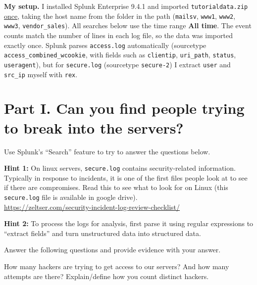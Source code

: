 \documentclass[a4paper, 10pt]{article}
\begin{document}
\myspace

\noindent\textbf{My setup.} I installed Splunk Enterprise 9.4.1 and imported \texttt{tutorialdata.zip} \underline{once},
taking the host name from the folder in the path (\texttt{mailsv}, \texttt{www1}, \texttt{www2}, \texttt{www3}, \texttt{vendor\_sales}).
All searches below use the time range \textbf{All time}.
The event counts match the number of lines in each log file, so the data was imported exactly once.
Splunk parses \texttt{access.log} automatically (sourcetype \texttt{access\_combined\_wcookie}, with fields such as
\texttt{clientip}, \texttt{uri\_path}, \texttt{status}, \texttt{useragent}),
but for \texttt{secure.log} (sourcetype \texttt{secure-2}) I extract \texttt{user} and \texttt{src\_ip} myself with \texttt{rex}.

\section*{\textbf{Part I.} Can you find people trying to break into the servers?}

Use Splunk's ``Search'' feature to try to answer the questions below.

\noindent \textbf{Hint 1:} On linux servers, \texttt{secure.log} contains security-related information.
Typically in response to incidents, it is one of the first files people look at to see if there are compromises.
Read this to see what to look for on Linux (this \texttt{secure.log} file is available in google drive). \\
\href{https://zeltser.com/security-incident-log-review-checklist/}{https://zeltser.com/security-incident-log-review-checklist/}

\noindent \textbf{Hint 2:} To process the logs for analysis,
first parse it using regular expressions to ``extract fields'' and turn unstructured data into structured data.

\myspace

Answer the following questions and provide evidence with your answer.

\begin{problem}
How many hackers are trying to get access to our servers?
And how many attempts are there?
Explain/define how you count distinct hackers.
\end{problem}
\end{document}
